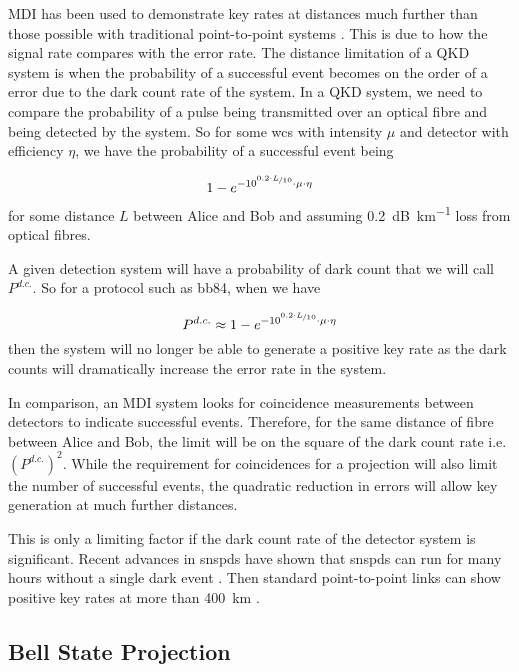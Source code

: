 \Ac{MDI} has been used to demonstrate key rates at distances much further than those possible with traditional point-to-point systems \cite{yin2016}. This is due to how the signal rate compares with the error rate. The distance limitation of a \ac{QKD} system is when the probability of a successful event becomes on the order of a error due to the dark count rate of the system. In a \ac{QKD} system, we  need to compare the probability of a pulse being transmitted over an optical fibre and being detected by the system. So for some \ac{wcs} with intensity $\mu$ and detector with efficiency $\eta$, we have the probability of a successful event being

\begin{equation}
	1 - e^{-10^{\nicefrac{0.2\cdot L}{10}} \cdot \mu \cdot \eta}
\end{equation}
for some distance $L$ between Alice and Bob and assuming \SI{0.2}{dB\per\km} loss from optical fibres.

A given detection system will have a probability of dark count that we will call $P^{d.c.}$. So for a protocol such as \ac{bb84}, when we have

\begin{equation}
	P^{d.c.} \approx 1 - e^{-10^{\nicefrac{0.2\cdot L}{10}} \cdot \mu \cdot \eta}
\end{equation}
then the system will no longer be able to generate a positive key rate as the dark counts will dramatically increase the error rate in the system.

In comparison, an \ac{MDI} system looks for coincidence measurements between detectors to indicate successful events. Therefore, for the same distance of fibre between Alice and Bob, the limit will be on the square of the dark count rate i.e.  $(P^{d.c.})^2$. While the requirement for coincidences for a projection will also limit the number of successful events, the quadratic reduction in errors will allow key generation at much further distances.

This is only a limiting factor if the dark count rate of the detector system is significant. Recent advances in \acp{snspd} have shown that \acp{snspd} can run for many hours without a single dark event \cite{wollman2017}. Then standard point-to-point links can show positive key rates at more than \SI{400}{\km} \cite{Boaron2018}.

\subsection{Bell State Projection}

